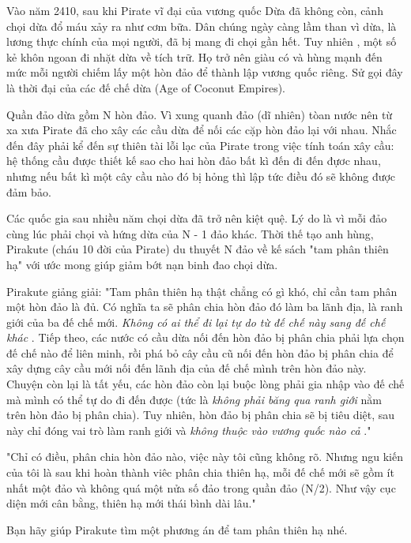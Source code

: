 



   Vào năm 2410, sau khi Pirate vĩ đại của vương quốc Dừa đã không còn, cảnh chọi dừa đổ máu xảy ra như cơm bữa. Dân chúng ngày càng lầm than vì dừa, là lương thực chính của mọi người, đã bị mang đi chọi gần hết. Tuy nhiên , một số kẻ khôn ngoan đi nhặt dừa về tích trữ. Họ trở nên giàu có và hùng mạnh đến mức mỗi người chiếm lấy một hòn đảo để thành lập vương quốc riêng. Sử gọi đây là thời đại của các đế chế dừa (Age of Coconut Empires).  

   Quần đảo dừa gồm N hòn đảo. Vì xung quanh đảo (dĩ nhiên) tòan nước nên từ xa xưa Pirate đã cho xây các cầu dừa để nối các cặp hòn đảo lại với nhau. Nhắc đến đây phải kể đến sự thiên tài lỗi lạc của Pirate trong việc tính toán xây cầu: hệ thống cầu được thiết kế sao cho hai hòn đảo bất kì đến đi đến đựơc nhau, nhưng nếu bất kì một cây cầu nào đó bị hỏng thì lập tức điều đó sẽ không được đảm bảo.  

   Các quốc gia sau nhiều năm chọi dừa đã trở nên kiệt quệ. Lý do là vì mỗi đảo cùng lúc phải chọi và hứng dừa của N - 1 đảo khác. Thời thế tạo anh hùng, Pirakute (cháu 10 đời của Pirate) du thuyết N đảo về kế sách "tam phân thiên hạ" với ước mong giúp giảm bớt nạn binh đao chọi dừa.  

   Pirakute giảng giải: "Tam phân thiên hạ thật chẳng có gì khó, chỉ cần tam phân một hòn đảo là đủ. Có nghĩa ta sẽ phân chia hòn đảo đó làm ba lãnh địa, là ranh giới của ba đế chế mới.   \emph{    Không có ai thể đi lại tự do từ đế chế này sang đế chế khác   }   . Tiếp theo, các nước có cầu dừa nối đến hòn đảo bị phân chia phải lựa chọn đế chế nào để liên minh, rồi phá bỏ cây cầu cũ nối đến hòn đảo bị phân chia để xây dựng cây cầu mới nối đến lãnh địa của đế chế mình trên hòn đảo này. Chuyện còn lại là tất yếu, các hòn đảo còn lại buộc lòng phải gia nhập vào đế chế mà mình có thể tự do đi đến được (tức là   \emph{    không phải băng qua ranh giới   }   nằm trên hòn đảo bị phân chia). Tuy nhiên, hòn đảo bị phân chia sẽ bị tiêu diệt, sau này chỉ đóng vai trò làm ranh giới và   \emph{    không thuộc vào vương quốc nào cả   }   ."  

   "Chỉ có điều, phân chia hòn đảo nào, việc này tôi cũng không rõ. Nhưng ngu kiến của tôi là sau khi hoàn thành viêc phân chia thiên hạ, mỗi đế chế mới sẽ gồm ít nhất một đảo và không quá một nửa số đảo trong quần đảo (N/2). Như vậy cục diện mới cân bằng, thiên hạ mới thái bình dài lâu."  

   Bạn hãy giúp Pirakute tìm một phương án để tam phân thiên hạ nhé.  

